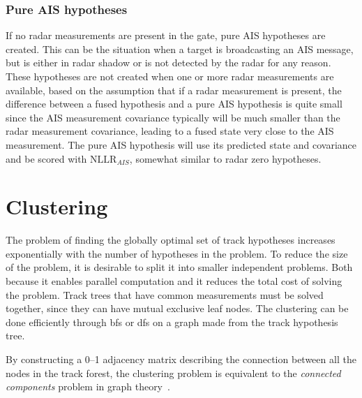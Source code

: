 \subsubsection{Pure AIS hypotheses}\label{subsec:pure_ais_hypotheses}
If no radar measurements are present in the gate, pure AIS hypotheses are created. This can be the situation when a target is broadcasting an AIS message, but is either in radar shadow or is not detected by the radar for any reason. These hypotheses are not created when one or more radar measurements are available, based on the assumption that if a radar measurement is present, the difference between a fused hypothesis and a pure AIS hypothesis is quite small since the AIS measurement covariance typically will be much smaller than the radar measurement covariance, leading to a fused state very close to the AIS measurement. The pure AIS hypothesis will use its predicted state and covariance and be  scored with \(\mathrm{NLLR}_{AIS}\), somewhat similar to radar zero hypotheses.

\section{Clustering}
The problem of finding the globally optimal set of track hypotheses increases exponentially with the number of hypotheses in the problem. To reduce the size of the problem, it is desirable to split it into smaller independent problems. Both because it enables parallel computation and it reduces the total cost of solving the problem. Track trees that have common measurements must be solved together, since they can have mutual exclusive leaf nodes. The clustering can be done efficiently through \gls{bfs} or \gls{dfs} on a graph made from the \gls{track hypothesis tree}.

By constructing a 0--1 adjacency matrix describing the connection between all the nodes in the \gls{track forest}, the clustering problem is equivalent to the \emph{connected components} problem in graph theory~\cite{Chen2015}.

